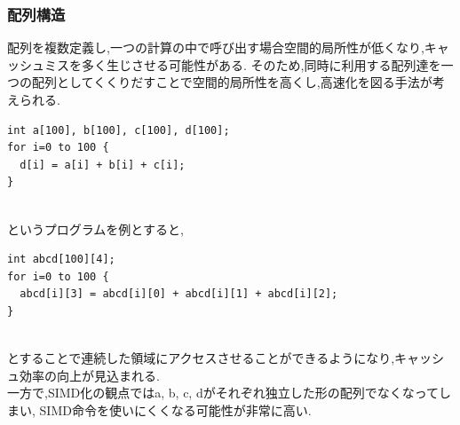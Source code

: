 \subsubsection{配列構造}
配列を複数定義し,一つの計算の中で呼び出す場合空間的局所性が低くなり,キャッシュミスを多く生じさせる可能性がある.
そのため,同時に利用する配列達を一つの配列としてくくりだすことで空間的局所性を高くし,高速化を図る手法が考えられる.\\
\begin{table}[htb]
{\footnotesize
\begin{framed}
\begin{verbatim}
int a[100], b[100], c[100], d[100];
for i=0 to 100 {
  d[i] = a[i] + b[i] + c[i];
}
\end{verbatim}
\end{framed}
}
\end{table}
\\
というプログラムを例とすると,\\
\begin{table}[htb]
{\footnotesize
\begin{framed}
\begin{verbatim}
int abcd[100][4];
for i=0 to 100 {
  abcd[i][3] = abcd[i][0] + abcd[i][1] + abcd[i][2];
}
\end{verbatim}
\end{framed}
}
\end{table}
\\
とすることで連続した領域にアクセスさせることができるようになり,キャッシュ効率の向上が見込まれる.\\
一方で,SIMD化の観点ではa, b, c, dがそれぞれ独立した形の配列でなくなってしまい,
SIMD命令を使いにくくなる可能性が非常に高い.\\

